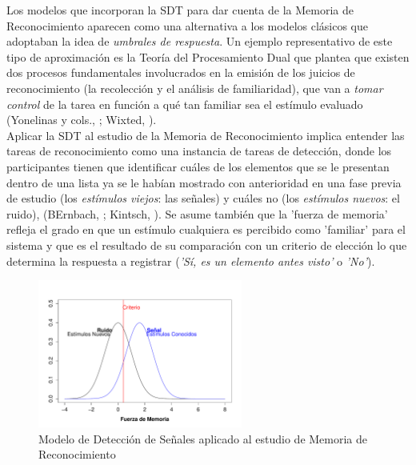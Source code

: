 Los modelos que incorporan la SDT para dar cuenta de la Memoria de Reconocimiento aparecen como una alternativa a los modelos clásicos que adoptaban la idea de \textit{umbrales de respuesta}. Un ejemplo representativo de este tipo de aproximación es la Teoría del Procesamiento Dual que plantea que existen dos procesos fundamentales involucrados en la emisión de los juicios de reconocimiento (la recolección y el análisis de familiaridad), que van a \textit{tomar control} de la tarea en función a qué tan familiar sea el estímulo evaluado (Yonelinas y cols., \citeyear{Yonelinas1996}; Wixted, \citeyear{Wixted2007}).\\

Aplicar la SDT al estudio de la Memoria de Reconocimiento implica entender las tareas de reconocimiento como una instancia de tareas de detección, donde los participantes tienen que identificar cuáles de los elementos que se le presentan dentro de una lista ya se le habían mostrado con anterioridad en una fase previa de estudio (los \textit{estímulos viejos}: las señales) y cuáles no (los \textit{estímulos nuevos}: el ruido), (BErnbach, \citeyear{Bernbach1967}; Kintsch, \citeyear{Kintsch1967}). Se asume también que la 'fuerza de memoria' refleja el grado en que un estímulo cualquiera es percibido como 'familiar' para el sistema y que es el resultado de su comparación con un criterio de elección lo que determina la respuesta a registrar (\textit{'Sí, es un elemento antes visto'} o \textit{'No'}).\\ 

\begin{figure}[th]
\centering
\includegraphics[width=0.60\textwidth]{Figures/RM_SDT_1} 
\decoRule
\caption[SDT en Memoria de Reconocimiento]{Modelo de Detección de Señales aplicado al estudio de Memoria de Reconocimiento}
\label{fig:RM_SDT_1}
\end{figure}

